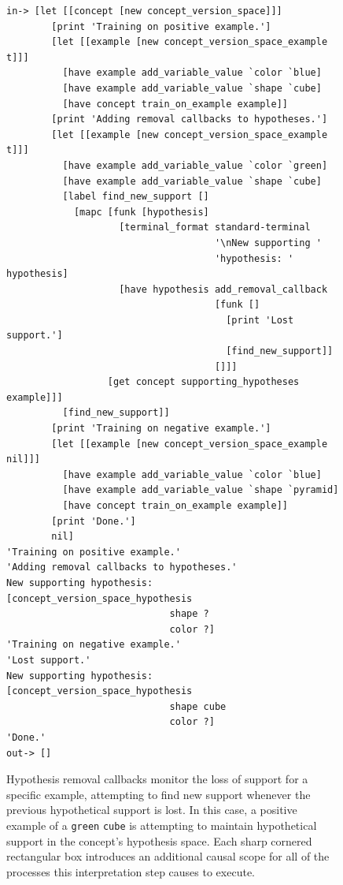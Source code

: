 \begin{figure}[h]
\centering
{\scriptsize
\begin{Verbatim}[frame=single]
 in-> [let [[concept [new concept_version_space]]]
        [print 'Training on positive example.']
        [let [[example [new concept_version_space_example t]]]
          [have example add_variable_value `color `blue]
          [have example add_variable_value `shape `cube]
          [have concept train_on_example example]]
        [print 'Adding removal callbacks to hypotheses.']
        [let [[example [new concept_version_space_example t]]]
          [have example add_variable_value `color `green]
          [have example add_variable_value `shape `cube]
          [label find_new_support []
            [mapc [funk [hypothesis]
                    [terminal_format standard-terminal
                                     '\nNew supporting '
                                     'hypothesis: ' hypothesis]
                    [have hypothesis add_removal_callback
                                     [funk []
                                       [print 'Lost support.']
                                       [find_new_support]]
                                     []]]
                  [get concept supporting_hypotheses example]]]
          [find_new_support]]
        [print 'Training on negative example.']
        [let [[example [new concept_version_space_example nil]]]
          [have example add_variable_value `color `blue]
          [have example add_variable_value `shape `pyramid]
          [have concept train_on_example example]]
        [print 'Done.']
        nil]
'Training on positive example.'
'Adding removal callbacks to hypotheses.'
New supporting hypothesis: [concept_version_space_hypothesis
                             shape ?
                             color ?]
'Training on negative example.'
'Lost support.'
New supporting hypothesis: [concept_version_space_hypothesis
                             shape cube
                             color ?]
'Done.'
out-> []
\end{Verbatim}
}
\caption[Hypothesis removal callbacks used to monitor the loss of
  support for a specific example, attempting to find new support
  whenever the previous hypothetical support is lost.]{Hypothesis
  removal callbacks monitor the loss of support for a specific
  example, attempting to find new support whenever the previous
  hypothetical support is lost.  In this case, a positive example of a
  {\tt{green}} {\tt{cube}} is attempting to maintain hypothetical
  support in the concept's hypothesis space.  Each sharp cornered
  rectangular box introduces an additional causal scope for all of the
  processes this interpretation step causes to execute.}
\label{figure:concept_version_space_hypothetical_support}
\end{figure}


